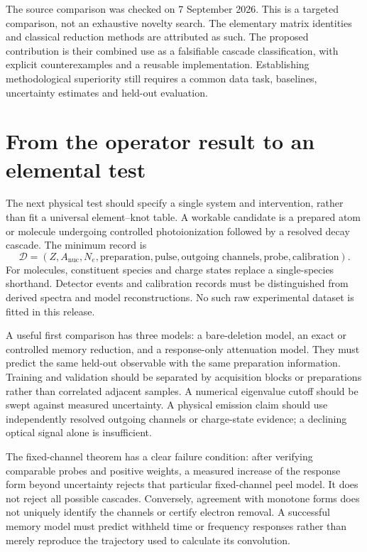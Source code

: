 \documentclass[11pt]{article}
\begin{document}
The source comparison was checked on 7 September 2026. This is a targeted comparison, not an exhaustive novelty search. The elementary matrix identities and classical reduction methods are attributed as such. The proposed contribution is their combined use as a falsifiable cascade classification, with explicit counterexamples and a reusable implementation. Establishing methodological superiority still requires a common data task, baselines, uncertainty estimates and held-out evaluation.

\section{From the operator result to an elemental test}
The next physical test should specify a single system and intervention, rather than fit a universal element--knot table. A workable candidate is a prepared atom or molecule undergoing controlled photoionization followed by a resolved decay cascade. The minimum record is
\begin{equation}
\mathcal D=(Z,A_{\mathrm{nuc}},N_e,\text{preparation},\text{pulse},\text{outgoing channels},\text{probe},\text{calibration}).
\end{equation}
For molecules, constituent species and charge states replace a single-species shorthand. Detector events and calibration records must be distinguished from derived spectra and model reconstructions. No such raw experimental dataset is fitted in this release.

A useful first comparison has three models: a bare-deletion model, an exact or controlled memory reduction, and a response-only attenuation model. They must predict the same held-out observable with the same preparation information. Training and validation should be separated by acquisition blocks or preparations rather than correlated adjacent samples. A numerical eigenvalue cutoff should be swept against measured uncertainty. A physical emission claim should use independently resolved outgoing channels or charge-state evidence; a declining optical signal alone is insufficient.

The fixed-channel theorem has a clear failure condition: after verifying comparable probes and positive weights, a measured increase of the response form beyond uncertainty rejects that particular fixed-channel peel model. It does not reject all possible cascades. Conversely, agreement with monotone forms does not uniquely identify the channels or certify electron removal. A successful memory model must predict withheld time or frequency responses rather than merely reproduce the trajectory used to calculate its convolution.
\end{document}
